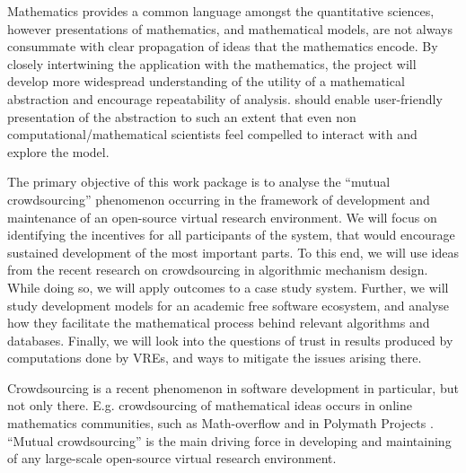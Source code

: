 \begin{workpackage}[id=social-aspects,wphases=0-48,
  title=Social Aspects,
  lead=UO,
  UORM=53,USHRM=8, USORM=5]
\begin{wpobjectives}




Mathematics provides a common language amongst the quantitative
sciences, however presentations of mathematics, and mathematical
models, are not always consummate with clear propagation of ideas that
the mathematics encode. By closely intertwining the application with
the mathematics, the project will develop more widespread
understanding of the utility of a mathematical abstraction and
encourage repeatability of analysis. \TheProject should enable
user-friendly presentation of the abstraction to such an extent that
even non computational/mathematical scientists feel compelled to
interact with and explore the model.



The primary objective of this work package is to analyse the ``mutual
crowdsourcing'' phenomenon occurring in the framework of development
and maintenance of an open-source virtual research environment.  We
will focus on identifying the incentives for all participants of the
system, that would encourage sustained development of the most
important parts.  To this end, we will use ideas from the recent
research on crowdsourcing in algorithmic mechanism design.  While
doing so, we will apply outcomes to a case study system.  Further, we
will study development models for an academic free software ecosystem,
and analyse how they facilitate the mathematical process behind
relevant algorithms and databases.  Finally, we will look into the
questions of trust in results produced by computations done by VREs,
and ways to mitigate the issues arising there.

\end{wpobjectives}

\begin{wpdescription}
Crowdsourcing is a recent phenomenon in software development in
particular, but not only there. E.g.  crowdsourcing of mathematical
ideas occurs in online mathematics communities, such as Math-overflow
\cite{mathoverflow} and in Polymath Projects \cite{polymath}.
``Mutual crowdsourcing'' is the main driving force in developing and
maintaining of any large-scale open-source virtual research
environment.


\end{wpdescription}
\end{workpackage}
